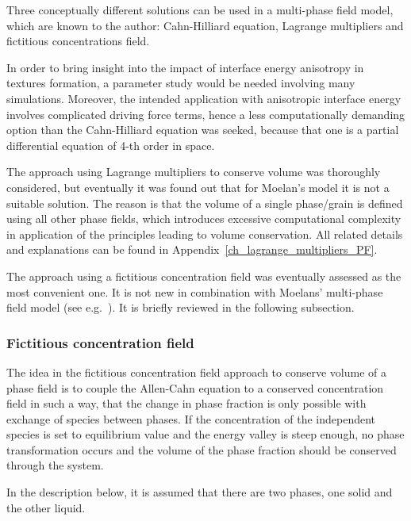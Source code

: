 	Three conceptually different solutions can be used in a multi-phase field model, which are known to the author: Cahn-Hilliard equation, Lagrange multipliers and fictitious concentrations field. 
	
	In order to bring insight into the impact of interface energy anisotropy in textures formation, a parameter study would be needed involving many simulations. Moreover, the intended application with anisotropic interface energy involves complicated driving force terms, hence a less computationally demanding option than the Cahn-Hilliard equation was seeked, because that one is a partial differential equation of 4-th order in space. 
	
	The approach using Lagrange multipliers to conserve volume was thoroughly considered, but eventually it was found out that for Moelan's model it is not a suitable solution. The reason is that the volume of a single phase/grain is defined using all other phase fields, which introduces excessive computational complexity in application of the principles leading to volume conservation. All related details and explanations can be found in Appendix~\ref{ch_lagrange_multipliers_PF}.
	
	The approach using a fictitious concentration field was eventually assessed as the most convenient one. It is not new in combination with Moelans' multi-phase field model (see e.g.~\cite{Yadav2016,Yadav2018vol_cons}). It is briefly reviewed in the following subsection. 
		
		\subsubsection{Fictitious concentration field}
		The idea in the fictitious concentration field approach to conserve volume of a phase field is to couple the Allen-Cahn equation to a conserved concentration field in such a way, that the change in phase fraction is only possible with exchange of species between phases. If the concentration of the independent species is set to equilibrium value and the energy valley is steep enough, no phase transformation occurs and the volume of the phase fraction should be conserved through the system. 
		
		In the description below, it is assumed that there are two phases, one solid and the other liquid.
		
